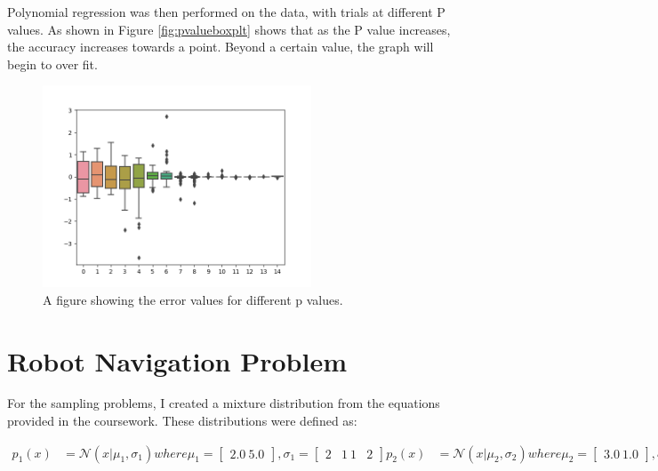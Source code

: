 \documentclass[a4paper, 11pt]{article}
\begin{document}
Polynomial regression was then performed on the data, with trials at different P values. As shown in Figure \ref{fig:pvalueboxplt} shows that as the P value increases, the accuracy increases towards a point. Beyond a certain value, the graph will begin to over fit.

\begin{figure}[h]
    \includegraphics[width=8cm]{fig/pvalueboxplot.png}
    \caption{A figure showing the error values for different p values.}
    \label{fig:traintestsplit}
\end{figure}

\pagebreak

\section{Robot Navigation Problem}

For the sampling problems, I created a mixture distribution from the equations provided in the coursework. These distributions were defined as:



\begin{equation}\label{eq:gauss1}
    \begin{align*}
        p_1(x) &= \mathcal{N}(x|\mu_1, \sigma_1) where \mu_1 = \begin{bmatrix}2.0 \ 5.0\end{bmatrix}, \sigma_1 = \begin{bmatrix}2 & 1 \ 1 & 2\end{bmatrix}
        p_2(x) &= \mathcal{N}(x|\mu_2, \sigma_2) where \mu_2 = \begin{bmatrix}3.0 \ 1.0\end{bmatrix}, \sigma_2 = \begin{bmatrix}0.1 & 0 \ 0 & 0.1\end{bmatrix} = 0.1 \mathcal{I}
        p(x) &= p_1(x) + p_2(x)
    \end{align*}
\end{equation}
\end{document}

